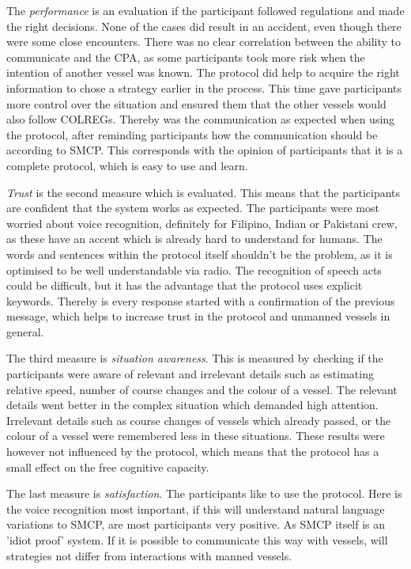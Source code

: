 The \emph{performance} is an evaluation if the participant followed regulations and made the right decisions. None of the cases did result in an accident, even though there were some close encounters. There was no clear correlation between the ability to communicate and the \acf{CPA}, as some participants took more risk when the intention of another vessel was known. The protocol did help to acquire the right information to chose a strategy earlier in the process. This time gave participants more control over the situation and ensured them that the other vessels would also follow \ac{COLREGs}.
Thereby was the communication as expected when using the protocol, after reminding participants how the communication should be according to \ac{SMCP}. This corresponds with the opinion of participants that it is a complete protocol, which is easy to use and learn.

\emph{Trust} is the second measure which is evaluated. This means that the participants are confident that the system works as expected. The participants were most worried about voice recognition, definitely for Filipino, Indian or Pakistani crew, as these have an accent which is already hard to understand for humans. The words and sentences within the protocol itself shouldn't be the problem, as it is optimised to be well understandable via radio. The recognition of speech acts could be difficult, but it has the advantage that the protocol uses explicit keywords. Thereby is every response started with a confirmation of the previous message, which helps to increase trust in the protocol and unmanned vessels in general.

The third measure is \emph{situation awareness}. This is measured by checking if the participants were aware of relevant and irrelevant details such as estimating relative speed, number of course changes and the colour of a vessel. The relevant details went better in the complex situation which demanded high attention. Irrelevant details such as course changes of vessels which already passed, or the colour of a vessel were remembered less in these situations. These results were however not influenced by the protocol, which means that the protocol has a small effect on the free cognitive capacity.

The last measure is \emph{satisfaction}. The participants like to use the protocol. Here is the voice recognition most important, if this will understand natural language variations to \ac{SMCP}, are most participants very positive. As \ac{SMCP} itself is an 'idiot proof' system. If it is possible to communicate this way with vessels, will strategies not differ from interactions with manned vessels.